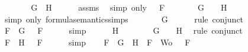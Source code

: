 \begin{isabellebody}
\ \ \isamarkupfalse%
\ \isamarkupfalse%
\ {\isachardoublequoteopen}{\isasymA}\ {\isasymTurnstile}\ {\isacharparenleft}G\ \isactrlbold {\isasymand}\ H{\isacharparenright}{\isachardoublequoteclose}\isanewline
\ \ \ \ \isamarkupfalse%
\ assms{\isacharparenleft}{}{\isacharparenright}\ \isamarkupfalse%
\ {\isacharparenleft}simp\ only{\isacharcolon}\ {\isacartoucheopen}{\isasymA}\ {\isasymTurnstile}\ F{\isacartoucheclose}{\isacharparenright}\isanewline
\ \ \isamarkupfalse%
\ \isamarkupfalse%
\ {\isachardoublequoteopen}{\isasymA}\ {\isasymTurnstile}\ G\ {\isasymand}\ {\isasymA}\ {\isasymTurnstile}\ H{\isachardoublequoteclose}\isanewline
\ \ \ \ \isamarkupfalse%
\ {\isacharparenleft}simp\ only{\isacharcolon}\ formula{\isacharunderscore}semantics{\isachardot}simps{\isacharparenleft}{}{\isacharparenright}{\isacharparenright}\isanewline
\ \ \isamarkupfalse%
\ \isamarkupfalse%
\ {\isachardoublequoteopen}{\isasymA}\ {\isasymTurnstile}\ G{\isachardoublequoteclose}\isanewline
\ \ \ \ \isamarkupfalse%
\ {\isacharparenleft}rule\ conjunct{}{\isacharparenright}\isanewline
\ \ \isamarkupfalse%
\ \isamarkupfalse%
\ {}{\isacharcolon}{\isachardoublequoteopen}{\isasymforall}F\ {\isasymin}\ {\isacharbraceleft}G{\isacharbraceright}{\isachardot}\ {\isasymA}\ {\isasymTurnstile}\ F{\isachardoublequoteclose}\isanewline
\ \ \ \ \isamarkupfalse%
\ simp\isanewline
\ \ \isamarkupfalse%
\ {\isachardoublequoteopen}{\isasymA}\ {\isasymTurnstile}\ H{\isachardoublequoteclose}\isanewline
\ \ \ \ \isamarkupfalse%
\ {\isacartoucheopen}{\isasymA}\ {\isasymTurnstile}\ G\ {\isasymand}\ {\isasymA}\ {\isasymTurnstile}\ H{\isacartoucheclose}\ \isamarkupfalse%
\ {\isacharparenleft}rule\ conjunct{}{\isacharparenright}\isanewline
\ \ \isamarkupfalse%
\ \isamarkupfalse%
\ {}{\isacharcolon}{\isachardoublequoteopen}{\isasymforall}F\ {\isasymin}\ {\isacharbraceleft}H{\isacharbraceright}{\isachardot}\ {\isasymA}\ {\isasymTurnstile}\ F{\isachardoublequoteclose}\isanewline
\ \ \ \ \isamarkupfalse%
\ simp\isanewline
\ \ \isamarkupfalse%
\ {\isachardoublequoteopen}{\isasymforall}F\ {\isasymin}\ {\isacharparenleft}{\isacharbraceleft}G{\isacharbraceright}\ {\isasymunion}\ {\isacharbraceleft}H{\isacharbraceright}{\isacharparenright}\ {\isasymunion}\ {\isacharparenleft}{\isacharbraceleft}F{\isacharbraceright}\ {\isasymunion}\ Wo{\isacharparenright}{\isachardot}\ {\isasymA}\ {\isasymTurnstile}\ F{\isachardoublequoteclose}\isanewline

\end{isabellebody}
